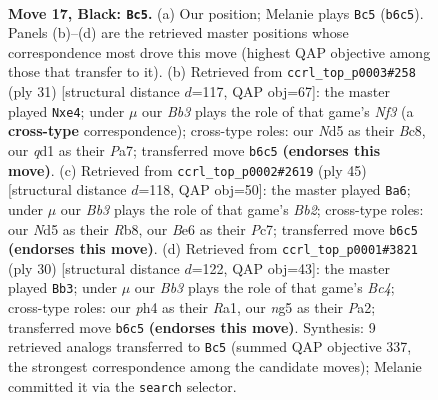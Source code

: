 \documentclass[11pt]{article}
\begin{document}
\clearpage

\begin{figure}[p]\centering
\begin{subfigure}{0.46\textwidth}\centering
\resizebox{\linewidth}{!}{%
\newchessgame
\chessboard[
  setfen={rn2r1k1/ppq2ppp/1b2b3/P2n2N1/7P/1N4P1/1P3PB1/R1BQ1RK1 b - - 0 17},
  showmover=false,
  pgfstyle=straightmove, color=movearrow, markmove={b6-c5}
]}
\caption{}
\end{subfigure}\hfill
\begin{subfigure}{0.46\textwidth}\centering
\resizebox{\linewidth}{!}{%
\newchessgame
\chessboard[
  setfen={r1b2rk1/pp2pp1p/1q3np1/6B1/Q2bN3/6P1/PP2PPBP/3R1RK1 b - - 3 16},
  showmover=false,
  pgfstyle=straightmove, color=movearrow, markmove={f6-e4}
]}
\caption{}
\end{subfigure}
\\[4pt]
\begin{subfigure}{0.46\textwidth}\centering
\resizebox{\linewidth}{!}{%
\newchessgame
\chessboard[
  setfen={1r1qr1k1/1bp2pb1/3p2pp/1N2n3/1P2Pn2/P1B2N1P/2B2PP1/2RQR1K1 b - - 0 23},
  showmover=false,
  pgfstyle=straightmove, color=movearrow, markmove={b7-a6}
]}
\caption{}
\end{subfigure}\hfill
\begin{subfigure}{0.46\textwidth}\centering
\resizebox{\linewidth}{!}{%
\newchessgame
\chessboard[
  setfen={2rq1rk1/1p2bppp/p4n2/7b/2BB4/2NQ3P/PP3PP1/R3R1K1 w - - 1 16},
  showmover=false,
  pgfstyle=straightmove, color=movearrow, markmove={c4-b3}
]}
\caption{}
\end{subfigure}
\caption{\textbf{Move 17, Black: \texttt{Bc5}.} (a) Our position; Melanie plays \texttt{Bc5} (\texttt{b6c5}). Panels (b)--(d) are the retrieved master positions whose correspondence most drove this move (highest QAP objective among those that transfer to it). (b) Retrieved from \texttt{ccrl\_top\_p0003\#258} (ply 31) [structural distance $d$=117, QAP obj=67]: the master played \texttt{Nxe4}; under $\mu$ our \emph{Bb3} plays the role of that game's \emph{Nf3} (a \textbf{cross-type} correspondence); cross-type roles: our \emph{N}d5 as their \emph{B}c8, our \emph{q}d1 as their \emph{P}a7; transferred move \texttt{b6c5} \textbf{(endorses this move)}. (c) Retrieved from \texttt{ccrl\_top\_p0002\#2619} (ply 45) [structural distance $d$=118, QAP obj=50]: the master played \texttt{Ba6}; under $\mu$ our \emph{Bb3} plays the role of that game's \emph{Bb2}; cross-type roles: our \emph{N}d5 as their \emph{R}b8, our \emph{B}e6 as their \emph{P}c7; transferred move \texttt{b6c5} \textbf{(endorses this move)}. (d) Retrieved from \texttt{ccrl\_top\_p0001\#3821} (ply 30) [structural distance $d$=122, QAP obj=43]: the master played \texttt{Bb3}; under $\mu$ our \emph{Bb3} plays the role of that game's \emph{Bc4}; cross-type roles: our \emph{p}h4 as their \emph{R}a1, our \emph{n}g5 as their \emph{P}a2; transferred move \texttt{b6c5} \textbf{(endorses this move)}. Synthesis: 9 retrieved analogs transferred to \texttt{Bc5} (summed QAP objective 337, the strongest correspondence among the candidate moves); Melanie committed it via the \texttt{search} selector.}
\label{fig:thought-m33}
\end{figure}
\end{document}
